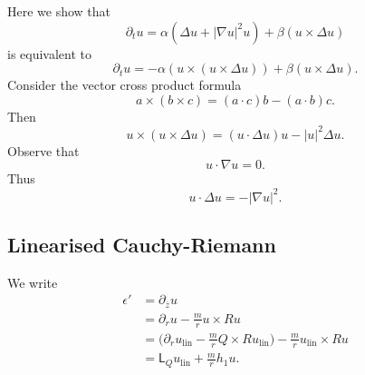 Here we show that 
    \[
        \partial_t u 
            = \alpha( \Delta u + |\nabla u|^2 u) + \beta (u \times \Delta u)
    \]
is equivalent to 
    \[
        \partial_t u 
            = -\alpha (u \times (u \times \Delta u)) + \beta (u \times \Delta u ).
    \]
Consider the vector cross product formula 
    \[
        a \times (b \times c) = (a \cdot c) b - (a \cdot b) c. 
    \]
Then 
    \[
        u \times (u \times \Delta u) = (u \cdot \Delta u) u - |u|^2 \Delta u. 
    \]
Observe that 
    \[
        u \cdot \nabla u = 0. 
    \]
Thus 
    \[
        u \cdot \Delta u = - |\nabla u|^2. 
    \]

\subsection{Linearised Cauchy-Riemann}

We write
\begin{align*}
    \epsilon' 
        &= \partial_{\overline z} u \\
        &= \partial_r u - \frac{m}{r} u \times Ru \\
        &= \Big(\partial_r u_{\mathrm{lin}}  - \frac{m}{r} Q \times R u_{\mathrm{lin}} \Big) - \frac{m}{r} u_{\mathrm{lin}} \times Ru\\
        &= \mathsf L_Q u_{\mathrm{lin}} + \frac{m}{r} h_1 u .
\end{align*}